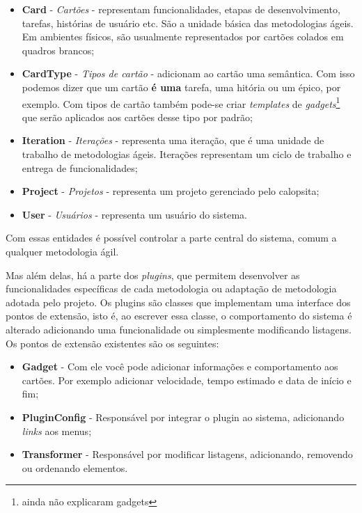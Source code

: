 \begin{itemize}
	\item{\textbf{Card} - \textit{Cartões} - representam funcionalidades, etapas de desenvolvimento, tarefas, histórias de usuário etc. São a unidade básica das metodologias ágeis. Em ambientes físicos, são usualmente representados por cartões colados em quadros brancos;}
	\item{\textbf{CardType} - \textit{Tipos de cartão} - adicionam ao cartão uma semântica. Com isso podemos dizer que um cartão \textbf{é uma} tarefa, uma hitória ou um épico, por exemplo. Com tipos de cartão também pode-se criar \textit{templates} de \textit{gadgets}\footnote{ainda não explicaram gadgets} que serão aplicados aos cartões desse tipo por padrão;}
	\item{\textbf{Iteration} - \textit{Iterações} - representa uma iteração, que é uma unidade de trabalho de metodologias ágeis. Iterações representam um ciclo de trabalho e entrega de funcionalidades;}
	\item{\textbf{Project} - \textit{Projetos} - representa um projeto gerenciado pelo calopsita;}
	\item{\textbf{User} - \textit{Usuários} - representa um usuário do sistema.}
\end{itemize}

Com essas entidades é possível controlar a parte central do sistema, comum a qualquer metodologia ágil. 

Mas além delas, há a parte dos \textit{plugins}, que permitem desenvolver as funcionalidades específicas de cada metodologia ou adaptação de metodologia adotada pelo projeto. Os plugins são classes que implementam uma interface dos pontos de extensão, isto é, ao escrever essa classe, o comportamento do sistema é alterado adicionando uma funcionalidade ou simplesmente modificando listagens. Os pontos de extensão existentes são os seguintes:

\begin{itemize}
	\item{\textbf{Gadget} - Com ele você pode adicionar informações e comportamento aos cartões. Por exemplo adicionar velocidade, tempo estimado e data de início e fim;}
	\item{\textbf{PluginConfig} - Responsável por integrar o plugin ao sistema, adicionando \textit{links} aos menus;}
	\item{\textbf{Transformer} - Responsável por modificar listagens, adicionando, removendo ou ordenando elementos.}
\end{itemize}

